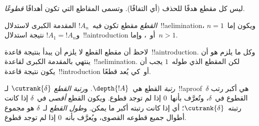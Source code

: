 \documentclass[../../../include/open-logic-section]{subfiles}
\begin{document}
ليس كل مقطع هدفًا للحذف (أي التفافًا). وتسمى المقاطع التي تكون أهدافًا
\emph{قطوعًا}.

\begin{defn}
\emph{القطع} مقطع تكون فيه~$!A_n$ المقدمة الكبرى لاستدلال~!!a{elimination}،
ويكون إما~$n=1$ و$!A_1=!A_n$ نتيجة استدلال~!!a{introduction} أو~\FalseInt،
وإما~$n>1$.
\end{defn}

لاحظ أن مقطع القطع لا يلزم أن يبدأ بنتيجة قاعدة~!!a{introduction}. وكل ما
يلزم هو أن ينتهي بالمقدمة الكبرى لقاعدة~!!a{elimination}. لكن المقطع الذي
طوله~$1$ يجب أن يكون نتيجة قاعدة~!!{introduction} أو~\FalseInt كي يُعد
قطعًا.

\begin{defn}
\emph{رتبة} القطع هي~$\depth{!A}$. و\emph{رتبة القطع}
$\cutrank{\delta}$ لـ~!!a{proof}~$\delta$ هي أكبر رتب القطوع في~$\delta$،
وتُعرَّف بأنها~$0$ إذا لم توجد قطوع. ويكون القطع \emph{أقصى} في~$\delta$
إذا كانت رتبته~$\cutrank{\delta}$؛ أي إذا كانت رتبته أكبر ما يمكن.
و\emph{طول القطع} لـ~$\delta$ هو مجموع أطوال جميع قطوعه القصوى، ويُعرَّف
بأنه~$0$ إذا لم توجد قطوع.
\end{defn}
\end{document}
